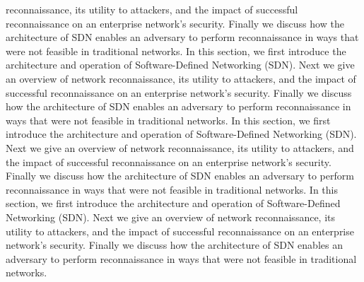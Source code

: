 reconnaissance, its utility to attackers, and the impact of successful
reconnaissance on an enterprise network's security. Finally  we discuss
how the architecture of SDN enables an adversary to perform reconnaissance 
in ways that were not feasible in traditional networks. In this section, we first introduce the architecture and operation of
Software-Defined Networking (SDN). Next we give an overview of network 
reconnaissance, its utility to attackers, and the impact of successful
reconnaissance on an enterprise network's security. Finally  we discuss
how the architecture of SDN enables an adversary to perform reconnaissance 
in ways that were not feasible in traditional networks. 
In this section, we first introduce the architecture and operation of
Software-Defined Networking (SDN). Next we give an overview of network 
reconnaissance, its utility to attackers, and the impact of successful
reconnaissance on an enterprise network's security. Finally  we discuss
how the architecture of SDN enables an adversary to perform reconnaissance 
in ways that were not feasible in traditional networks. 
In this section, we first introduce the architecture and operation of
Software-Defined Networking (SDN). Next we give an overview of network 
reconnaissance, its utility to attackers, and the impact of successful
reconnaissance on an enterprise network's security. Finally  we discuss
how the architecture of SDN enables an adversary to perform reconnaissance 
in ways that were not feasible in traditional networks. 